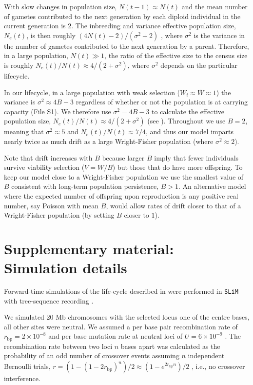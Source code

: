 \documentclass[]{article}
\begin{document}
With slow changes in population size, $N(t-1)\approx N(t)$ and the mean number of gametes contributed to the next generation by each diploid individual in the current generation is $2$.
The inbreeding and variance effective population size, $N_e(t)$, is then roughly $(4N(t) - 2)/(\sigma^2+2)$ \citep[equation 7.6.4.3 in][]{crow1970introduction}, where $\sigma^2$ is the variance in the number of gametes contributed to the next generation by a parent.
Therefore, in a large population, $N(t)\gg1$, the ratio of the effective size to the census size is roughly $N_e(t)/N(t) \approx 4/(2+\sigma^2)$, where $\sigma^2$ depends on the particular lifecycle.

In our lifecycle, in a large population with weak selection ($W_i\approx\overline{W}\approx1$) the variance is $\sigma^2\approx4B-3$ regardless of whether or not the population is at carrying capacity (File S1). 
We therefore use $\sigma^2 = 4B-3$ to calculate the effective population size, $N_e(t)/N(t) \approx 4/(2+\sigma^2)$ (see ).
Throughout we use $B=2$, meaning that $\sigma^2 \approx 5$ and $N_e(t)/N(t)\approx7/4$, and thus our model imparts nearly twice as much drift as a large Wright-Fisher population (where $\sigma^2\approx2$).

Note that drift increases with $B$ because larger $B$ imply that fewer individuals survive viability selection ($V= W/B$) but those that do have more offspring.
To keep our model close to a Wright-Fisher population we use the smallest value of $B$ consistent with long-term population persistence, $B>1$.
An alternative model where the expected number of offspring upon reproduction is any positive real number, say Poisson with mean $B$, would allow rates of drift closer to that of a Wright-Fisher population (by setting $B$ closer to 1).

\section*{Supplementary material: Simulation details}
\label{sec:simdetails}

Forward-time simulations of the life-cycle described in  were performed in \texttt{SLiM} \citep[version 3.3;][]{Haller2019slim} with tree-sequence recording \citep{Haller2019tree}.

We simulated 20 Mb chromosomes with the selected locus one of the centre bases, all other sites were neutral.
We assumed a per base pair recombination rate of $r_\mathrm{bp}=2\times10^{-8}$ \citep[i.e., 2 cM/Mb; e.g.,][]{mackay2012drosophila} and per base mutation rate at neutral loci of $U=6\times10^{-9}$ \citep[e.g.,][]{haag2007direct}.
The recombination rate between two loci $n$ bases apart was calculated as the probability of an odd number of crossover events assuming $n$ independent Bernoulli trials, $r = (1-(1-2r_\mathrm{bp})^n)/2 \approx (1-e^{2 r_\mathrm{bp} n})/2$ \citep[equation 3 in][]{haldane1919combination}, i.e., no crossover interference.
\end{document}
